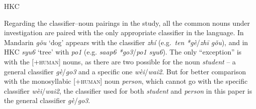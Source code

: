 \documentclass[output=paper]{langsci/langscibook}
\begin{document}
\ea\label{ex:23.7} \gls{HKC} %
	\z
\z

Regarding the classifier--noun pairings in the study, all the common nouns
under investigation are paired with the only appropriate
classifier in the language. In Mandarin \emph{gǒu}
‘dog’ appears with the classifier \emph{zhí} (e.g.\ \emph{ten
*gè}/\emph{zhī gǒu}), and in \gls{HKC} \emph{syu6}
‘tree’ with \emph{po1} (e.g. \emph{saap6 *go3}/\emph{po1 syu6}). The only
\enquote{exception} is with the [+\textsc{human}] nouns, as there are two
possible  for the noun \emph{student} -- a general classifier
\emph{gè}/\emph{go3} and a specific one \emph{wèi}/\emph{wai2}. But for better
comparison with the monosyllabic [+\textsc{human}] noun \emph{person}, which
cannot go with the specific classifier \emph{wèi}/\emph{wai2},
the classifier used for both \emph{student} and \emph{person}
in this paper is the general classifier \emph{gè}/\emph{go3}.
\end{document}
